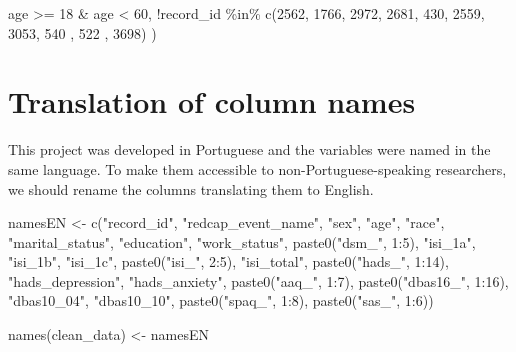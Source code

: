 \documentclass[
  letterpaper,
  DIV=11,
  numbers=noendperiod]{scrreprt}
\newenvironment{Shaded}{\begin{snugshade}}{\end{snugshade}}
\newcommand{\DecValTok}[1]{\textcolor[rgb]{0.68,0.00,0.00}{#1}}
\newcommand{\FunctionTok}[1]{\textcolor[rgb]{0.28,0.35,0.67}{#1}}
\newcommand{\NormalTok}[1]{\textcolor[rgb]{0.00,0.23,0.31}{#1}}
\newcommand{\OtherTok}[1]{\textcolor[rgb]{0.00,0.23,0.31}{#1}}
\newcommand{\SpecialCharTok}[1]{\textcolor[rgb]{0.37,0.37,0.37}{#1}}
\newcommand{\StringTok}[1]{\textcolor[rgb]{0.13,0.47,0.30}{#1}}
\begin{document}
\begin{Shaded}
\begin{Highlighting}[]
\NormalTok{                age }\SpecialCharTok{\textgreater{}=} \DecValTok{18} \SpecialCharTok{\&}\NormalTok{ age }\SpecialCharTok{\textless{}} \DecValTok{60}\NormalTok{,}
                \SpecialCharTok{!}\NormalTok{record\_id }\SpecialCharTok{\%in\%} \FunctionTok{c}\NormalTok{(}\DecValTok{2562}\NormalTok{, }\DecValTok{1766}\NormalTok{, }\DecValTok{2972}\NormalTok{, }\DecValTok{2681}\NormalTok{, }\DecValTok{430}\NormalTok{, }\DecValTok{2559}\NormalTok{, }\DecValTok{3053}\NormalTok{, }\DecValTok{540}\NormalTok{ , }\DecValTok{522}\NormalTok{ , }\DecValTok{3698}\NormalTok{)}
\NormalTok{                )}
\end{Highlighting}
\end{Shaded}

\hypertarget{translation-of-column-names}{%
\section{Translation of column
names}\label{translation-of-column-names}}

This project was developed in Portuguese and the variables were named in
the same language. To make them accessible to non-Portuguese-speaking
researchers, we should rename the columns translating them to English.

\begin{Shaded}
\begin{Highlighting}[]
\NormalTok{namesEN }\OtherTok{\textless{}{-}} \FunctionTok{c}\NormalTok{(}\StringTok{"record\_id"}\NormalTok{, }\StringTok{"redcap\_event\_name"}\NormalTok{, }\StringTok{"sex"}\NormalTok{, }\StringTok{"age"}\NormalTok{, }\StringTok{"race"}\NormalTok{, }\StringTok{"marital\_status"}\NormalTok{, }\StringTok{"education"}\NormalTok{, }\StringTok{"work\_status"}\NormalTok{, }\FunctionTok{paste0}\NormalTok{(}\StringTok{"dsm\_"}\NormalTok{, }\DecValTok{1}\SpecialCharTok{:}\DecValTok{5}\NormalTok{), }\StringTok{"isi\_1a"}\NormalTok{, }\StringTok{"isi\_1b"}\NormalTok{, }\StringTok{"isi\_1c"}\NormalTok{, }\FunctionTok{paste0}\NormalTok{(}\StringTok{"isi\_"}\NormalTok{, }\DecValTok{2}\SpecialCharTok{:}\DecValTok{5}\NormalTok{), }\StringTok{"isi\_total"}\NormalTok{, }\FunctionTok{paste0}\NormalTok{(}\StringTok{"hads\_"}\NormalTok{, }\DecValTok{1}\SpecialCharTok{:}\DecValTok{14}\NormalTok{), }\StringTok{"hads\_depression"}\NormalTok{, }\StringTok{"hads\_anxiety"}\NormalTok{, }\FunctionTok{paste0}\NormalTok{(}\StringTok{"aaq\_"}\NormalTok{, }\DecValTok{1}\SpecialCharTok{:}\DecValTok{7}\NormalTok{), }\FunctionTok{paste0}\NormalTok{(}\StringTok{"dbas16\_"}\NormalTok{, }\DecValTok{1}\SpecialCharTok{:}\DecValTok{16}\NormalTok{), }\StringTok{"dbas10\_04"}\NormalTok{, }\StringTok{"dbas10\_10"}\NormalTok{, }\FunctionTok{paste0}\NormalTok{(}\StringTok{"spaq\_"}\NormalTok{, }\DecValTok{1}\SpecialCharTok{:}\DecValTok{8}\NormalTok{), }\FunctionTok{paste0}\NormalTok{(}\StringTok{"sas\_"}\NormalTok{, }\DecValTok{1}\SpecialCharTok{:}\DecValTok{6}\NormalTok{))}

\FunctionTok{names}\NormalTok{(clean\_data) }\OtherTok{\textless{}{-}}\NormalTok{ namesEN}
\end{Highlighting}
\end{Shaded}
\end{document}
